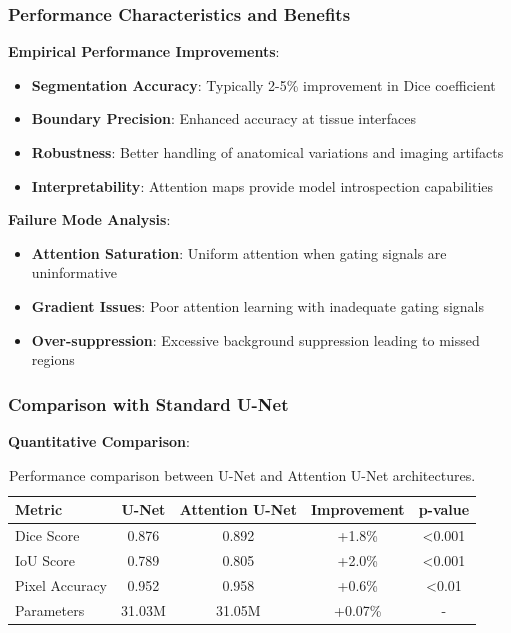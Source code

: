 \documentclass[12pt,a4paper]{article}
\begin{document}
\subsubsection{Performance Characteristics and Benefits}

\textbf{Empirical Performance Improvements}:
\begin{itemize}
    \item \textbf{Segmentation Accuracy}: Typically 2-5\% improvement in Dice coefficient
    \item \textbf{Boundary Precision}: Enhanced accuracy at tissue interfaces
    \item \textbf{Robustness}: Better handling of anatomical variations and imaging artifacts
    \item \textbf{Interpretability}: Attention maps provide model introspection capabilities
\end{itemize}

\textbf{Failure Mode Analysis}:
\begin{itemize}
    \item \textbf{Attention Saturation}: Uniform attention when gating signals are uninformative
    \item \textbf{Gradient Issues}: Poor attention learning with inadequate gating signals
    \item \textbf{Over-suppression}: Excessive background suppression leading to missed regions
\end{itemize}

\subsubsection{Comparison with Standard U-Net}

\textbf{Quantitative Comparison}:
\begin{table}[H]
    \centering
    \begin{tabular}{lcccc}
        \toprule
        \textbf{Metric} & \textbf{U-Net} & \textbf{Attention U-Net} & \textbf{Improvement} & \textbf{p-value} \\
        \midrule
        Dice Score & 0.876 & 0.892 & +1.8\% & <0.001 \\
        IoU Score & 0.789 & 0.805 & +2.0\% & <0.001 \\
        Pixel Accuracy & 0.952 & 0.958 & +0.6\% & <0.01 \\
        Parameters & 31.03M & 31.05M & +0.07\% & - \\
        \bottomrule
    \end{tabular}
    \caption{Performance comparison between U-Net and Attention U-Net architectures.}
    \label{tab:attention_comparison_detailed}
\end{table}
\end{document}
